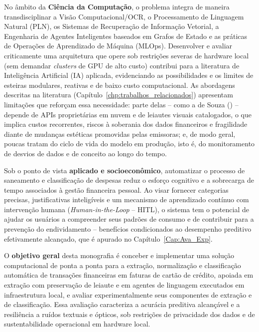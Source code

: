 No âmbito da \textbf{Ciência da Computação}, o problema integra de maneira transdisciplinar a Visão Computacional/OCR, o Processamento de Linguagem Natural (PLN), os Sistemas de Recuperação de Informação Vetorial, a Engenharia de Agentes Inteligentes baseados em Grafos de Estado e as práticas de Operações de Aprendizado de Máquina (MLOps). Desenvolver e avaliar criticamente uma arquitetura que opere sob restrições severas de hardware local (sem demandar \textit{clusters} de GPU de alto custo) contribui para a literatura de Inteligência Artificial (IA) aplicada, evidenciando as possibilidades e os limites de esteiras modulares, reativas e de baixo custo computacional. As abordagens descritas na literatura (Capítulo~\ref{chp:trabalhos_relacionados}) apresentam limitações que reforçam essa necessidade: parte delas -- como a de Souza (\citeyear{souza2025extracao}) -- depende de APIs proprietárias em nuvem e de leiautes visuais catalogados, o que implica custos recorrentes, riscos à soberania dos dados financeiros e fragilidade diante de mudanças estéticas promovidas pelas emissoras; e, de modo geral, poucas tratam do ciclo de vida do modelo em produção, isto é, do monitoramento de desvios de dados e de conceito ao longo do tempo.

Sob o ponto de vista \textbf{aplicado e socioeconômico}, automatizar o processo de saneamento e classificação de despesas reduz o esforço cognitivo e a sobrecarga de tempo associados à gestão financeira pessoal. Ao visar fornecer categorias precisas, justificativas inteligíveis e um mecanismo de aprendizado contínuo com intervenção humana (\textit{Human-in-the-Loop} -- HITL), o sistema tem o potencial de ajudar os usuários a compreender seus padrões de consumo e de contribuir para a prevenção do endividamento -- benefícios condicionados ao desempenho preditivo efetivamente alcançado, que é apurado no Capítulo~\ref{Cap:Ava_Exp}.

O \textbf{objetivo geral} desta monografia é conceber e implementar uma solução computacional de ponta a ponta para a extração, normalização e classificação automática de transações financeiras em faturas de cartão de crédito, apoiada em extração com preservação de leiaute e em agentes de linguagem executados em infraestrutura local, e avaliar experimentalmente seus componentes de extração e de classificação. Essa avaliação caracteriza a acurácia preditiva alcançável e a resiliência a ruídos textuais e ópticos, sob restrições de privacidade dos dados e de sustentabilidade operacional em hardware local.

